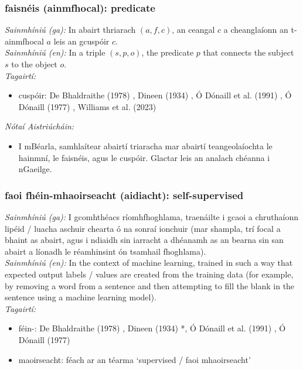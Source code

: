 \subsubsection*{faisnéis (ainmfhocal): predicate}
 \noindent \textit{Sainmhíniú (ga):} In abairt thriarach $(a,f,c)$, an ceangal $c$ a cheanglaíonn an t-ainmfhocal $a$ leis an gcuspóir $c$.
\\
 \noindent \textit{Sainmhíniú (en):} In a triple $(s,p,o)$, the predicate $p$ that connects the subject $s$ to the object $o$.
\\
 \noindent \textit{Tagairtí:}
\begin{itemize}
	\item cuspóir: De Bhaldraithe (1978) \cite{de-bhaldraithe}, Dineen (1934) \cite{dineen}, Ó Dónaill et al. (1991) \cite{focloir-beag}, Ó Dónaill (1977) \cite{odonaill}, Williams et al. (2023) \cite{storchiste}
\end{itemize}

 \noindent \textit{Nótaí Aistriúcháin:}
\begin{itemize}
	\item I mBéarla, samhlaítear abairtí triaracha mar abairtí teangeolaíochta le hainmní, le faisnéis, agus le cuspóir. Glactar leis an analach chéanna i nGaeilge.
\end{itemize}


\subsubsection*{faoi fhéin-mhaoirseacht (aidiacht): self-supervised}
 \noindent \textit{Sainmhíniú (ga):} I gcomhthéacs ríomhfhoghlama, traenáilte i gcaoi a chruthaíonn lipéid / luacha aschuir chearta ó na sonraí ionchuir (mar shampla, trí focal a bhaint as abairt, agus i ndiaidh sin iarracht a dhéanamh as an bearna sin san abairt a líonadh le réamhinsint ón tsamhail fhoghlama).
\\
 \noindent \textit{Sainmhíniú (en):} In the context of machine learning, trained in such a way that expected output labels / values are created from the training data (for example, by removing a word from a sentence and then attempting to fill the blank in the sentence using a machine learning model).
\\
 \noindent \textit{Tagairtí:}
\begin{itemize}
	\item féin-: De Bhaldraithe (1978) \cite{de-bhaldraithe}, Dineen (1934) \cite{dineen}*, Ó Dónaill et al. (1991) \cite{focloir-beag}, Ó Dónaill (1977) \cite{odonaill}
	\item maoirseacht: féach ar an téarma `supervised / faoi mhaoirseacht'
\end{itemize}

